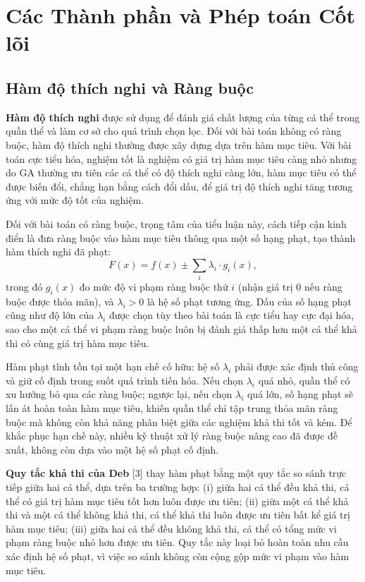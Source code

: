 \section{Các Thành phần và Phép toán Cốt lõi}
\label{sec:toan-tu-cot-loi}

\subsection*{Hàm độ thích nghi và Ràng buộc}
\label{subsec:ham-thich-nghi}

\textbf{Hàm độ thích nghi} được sử dụng để đánh giá chất lượng của
từng cá thể trong quần thể và làm cơ sở cho quá trình chọn lọc. Đối
với bài toán không có ràng buộc, hàm độ thích nghi thường được xây
dựng dựa trên hàm mục tiêu. Với bài toán cực tiểu hóa, nghiệm tốt là
nghiệm có giá trị hàm mục tiêu càng nhỏ nhưng do GA thường ưu tiên các
cá thể có độ thích nghi càng lớn, hàm mục tiêu có thể được biến đổi,
chẳng hạn bằng cách đổi dấu, để giá trị độ thích nghi tăng tương ứng
với mức độ tốt của nghiệm.

Đối với bài toán có ràng buộc, trọng tâm của tiểu luận này,
cách tiếp cận kinh điển là đưa ràng buộc vào hàm mục tiêu thông qua một
số hạng phạt, tạo thành hàm thích nghi đã phạt:
\begin{equation}
F(x) = f(x) \pm \sum_{i} \lambda_i \cdot g_i(x),
\label{eq:ham-phat}
\end{equation}
trong đó $g_i(x)$ đo mức độ vi phạm ràng buộc thứ $i$ (nhận giá trị $0$
nếu ràng buộc được thỏa mãn), và $\lambda_i > 0$ là hệ số phạt tương
ứng. Dấu của số hạng phạt cũng như độ lớn của $\lambda_i$ được chọn
tùy theo bài toán là cực tiểu hay cực đại hóa, sao cho một cá thể vi
phạm ràng buộc luôn bị đánh giá thấp hơn một cá thể khả thi có cùng
giá trị hàm mục tiêu.

Hàm phạt tĩnh tồn tại một hạn chế cố hữu: hệ số $\lambda_i$ phải được
xác định thủ công và giữ cố định trong suốt quá trình tiến hóa. Nếu
chọn $\lambda_i$ quá nhỏ, quần thể có xu hướng bỏ qua các ràng buộc;
ngược lại, nếu chọn $\lambda_i$ quá lớn, số hạng phạt sẽ lấn át hoàn
toàn hàm mục tiêu, khiến quần thể chỉ tập trung thỏa mãn ràng buộc mà
không còn khả năng phân biệt giữa các nghiệm khả thi tốt và kém. Để
khắc phục hạn chế này, nhiều kỹ thuật xử lý ràng buộc nâng cao đã được
đề xuất, không còn dựa vào một hệ số phạt cố định.

\textbf{Quy tắc khả thi của Deb} [3] thay hàm phạt bằng một quy tắc so
sánh trực tiếp giữa hai cá thể, dựa trên ba trường hợp: (i) giữa hai
cá thể đều khả thi, cá thể có giá trị hàm mục tiêu tốt hơn luôn được
ưu tiên; (ii) giữa một cá thể khả thi và một cá thể không khả thi, cá
thể khả thi luôn được ưu tiên bất kể giá trị hàm mục tiêu; (iii) giữa
hai cá thể đều không khả thi, cá thể có tổng mức vi phạm ràng buộc nhỏ
hơn được ưu tiên. Quy tắc này loại bỏ hoàn toàn nhu cầu xác định hệ số
phạt, vì việc so sánh không còn cộng gộp mức vi phạm vào hàm mục tiêu.

